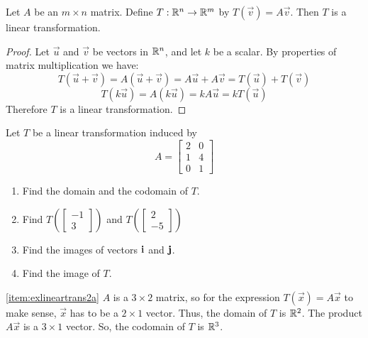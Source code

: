 \documentclass{ximera}
\begin{document}
  \begin{theorem}\label{th:matrixtran} Let $A$ be an $m\times n$ matrix.  Define $T:\mathbb{R}^n\rightarrow\mathbb{R}^m$ by $T(\vec{v})=A\vec{v}$.  Then $T$ is a linear transformation.
\end{theorem}

\begin{proof}  Let $\vec{u}$ and $\vec{v}$ be vectors in $\mathbb{R}^n$, and let $k$ be a scalar.  By properties of matrix multiplication we have:
$$T(\vec{u}+\vec{v})=A(\vec{u}+\vec{v})=A\vec{u}+A\vec{v}=T(\vec{u})+T(\vec{v})$$
$$T(k\vec{u})=A(k\vec{u})=kA\vec{u}=kT(\vec{u})$$
Therefore $T$ is a linear transformation.
\end{proof}

\begin{example}\label{ex:lineartrans2}
Let $T$ be a linear transformation induced by $$A=\begin{bmatrix}
2&0\\
1&4\\
0&1
\end{bmatrix}$$
\begin{enumerate}
\item \label{item:exlineartrans2a}
Find the domain and the codomain of $T$.
\item \label{item:exlineartrans2b}
Find $T\left(\begin{bmatrix}
-1\\
3
\end{bmatrix}\right)$ and $T\left(\begin{bmatrix}
2\\
-5
\end{bmatrix}\right)$

\item \label{item:exlineartrans2c}
Find the images of vectors ${\bf i}$ and ${\bf j}$.
\item \label{item:exlineartrans2d}
Find the image of $T$.
\end{enumerate}

\begin{explanation}
\ref{item:exlineartrans2a} $A$ is a $3\times 2$ matrix, so for the expression $T(\vec{x})=A\vec{x}$ to make sense, $\vec{x}$ has to be a $2\times 1$ vector.  Thus, the domain of $T$ is $\mathbb{R}^2$.  The product $A\vec{x}$ is a $3\times 1$ vector.  So, the codomain of $T$ is $\mathbb{R}^3$.


\end{explanation}
\end{example}
\end{document}

